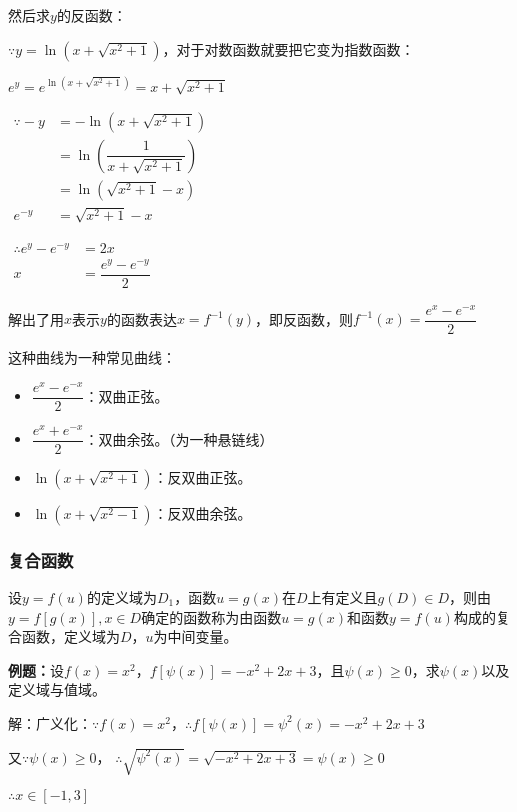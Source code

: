 \documentclass[UTF8, 12pt]{ctexart}
\begin{document}
然后求$y$的反函数：

$\because y=\ln(x+\sqrt{x^2+1})$，对于对数函数就要把它变为指数函数：

$e^y=e^{\ln(x+\sqrt{x^2+1})}=x+\sqrt{x^2+1}$

$
    \begin{aligned}
        \because -y & =-\ln(x+\sqrt{x^2+1})          \\
                    & =\ln(\dfrac{1}{x+\sqrt{x^2+1}}) \\
                    & =\ln(\sqrt{x^2+1}-x)           \\
        e^{-y}      & =\sqrt{x^2+1}-x
    \end{aligned}
$

$
    \begin{aligned}
        \therefore e^y-e^{-y} & =2x                   \\
        x                     & =\dfrac{e^y-e^{-y}}{2}
    \end{aligned}
$

解出了用$x$表示$y$的函数表达$x=f^{-1}(y)$，即反函数，则$f^{-1}(x)=\dfrac{e^x-e^{-x}}{2}$

这种曲线为一种常见曲线：

\begin{itemize}
    \item $\dfrac{e^x-e^{-x}}{2}$：双曲正弦。
    \item $\dfrac{e^x+e^{-x}}{2}$：双曲余弦。（为一种悬链线）
    \item $\ln(x+\sqrt{x^2+1})$：反双曲正弦。
    \item $\ln(x+\sqrt{x^2-1})$：反双曲余弦。
\end{itemize}

\subsubsection{复合函数}
设$y=f(u)$的定义域为$D_1$，函数$u=g(x)$在$D$上有定义且$g(D)\in D$，则由$y=f[g(x)],x\in D$确定的函数称为由函数$u=g(x)$和函数$y=f(u)$构成的复合函数，定义域为$D$，$u$为中间变量。

\textbf{例题：}设$f(x)=x^2$，$f[\psi(x)]=-x^2+2x+3$，且$\psi(x)\geqslant 0$，求$\psi(x)$以及定义域与值域。

解：广义化：$\because f(x)=x^2$，$\therefore f[\psi(x)]=\psi^2(x)=-x^2+2x+3$

又$\because\psi(x)\geqslant 0$， $\therefore\sqrt{\psi^2(x)}=\sqrt{-x^2+2x+3}=\psi(x)\geqslant 0$

$\therefore x\in[-1,3]$
\end{document}
